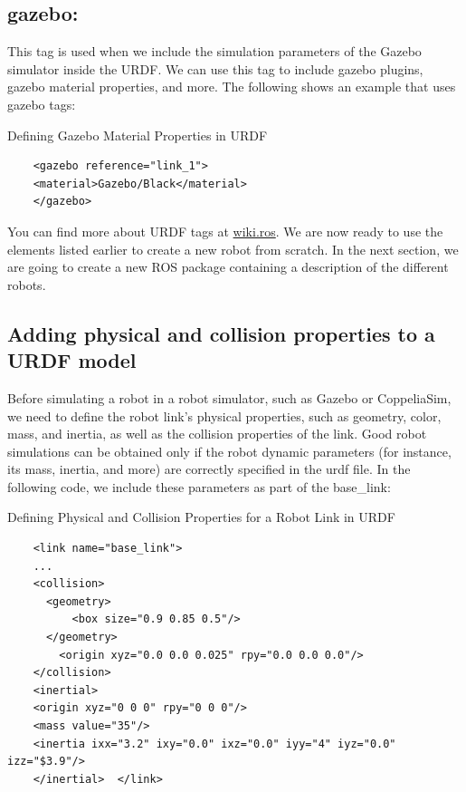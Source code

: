 \documentclass[../../main]{subfiles}
\begin{document}
\subsection{gazebo:}
This tag is used when we include the simulation parameters of the
Gazebo simulator inside the URDF. We can use this tag to include gazebo plugins,
gazebo material properties, and more. The following shows an example that uses
gazebo tags:

\begin{codebox}[]{Defining Gazebo Material Properties in URDF }
  \begin{verbatim}
    <gazebo reference="link_1">
    <material>Gazebo/Black</material>
    </gazebo>
\end{verbatim}
  \end{codebox}
You can find more about URDF tags at \href{http://wiki.ros.org/urdf/XML}{wiki.ros}\cite{ros_urdf_xml}. We are now
ready to use the elements listed earlier to create a new robot from scratch. In the next
section, we are going to create a new ROS package containing a description of the different
robots.

\subsection{Adding physical and collision properties to a URDF model}
Before simulating a robot in a robot simulator, such as Gazebo or CoppeliaSim, we need
to define the robot link's physical properties, such as geometry, color, mass, and inertia, as
well as the collision properties of the link.
Good robot simulations can be obtained only if the robot dynamic parameters (for
instance, its mass, inertia, and more) are correctly specified in the urdf file. In the
following code, we include these parameters as part of the base\_link:
\begin{codebox}[]{Defining Physical and Collision Properties for a Robot Link in URDF}
  
  \begin{verbatim}
    <link name="base_link">
    ...
    <collision>
      <geometry>
          <box size="0.9 0.85 0.5"/>
      </geometry>
        <origin xyz="0.0 0.0 0.025" rpy="0.0 0.0 0.0"/>
    </collision>
    <inertial>
    <origin xyz="0 0 0" rpy="0 0 0"/>
    <mass value="35"/>
    <inertia ixx="3.2" ixy="0.0" ixz="0.0" iyy="4" iyz="0.0" izz="$3.9"/>
    </inertial>  </link>
\end{verbatim}
  \end{codebox}
\end{document}
